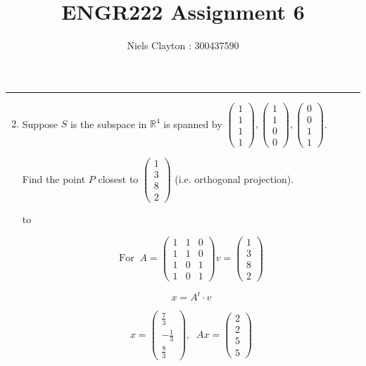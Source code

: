 \documentclass[a4paper,11pt]{article}
\title{\LARGE{\textbf{ENGR222 Assignment 6}}}
\author{Niels Clayton : 300437590}
\date{}
\newcommand{\hdotrule}[1]{\hbox to \textwidth{\leaders\hbox to #1pt{\hss . \hss}\hfil}}
\begin{document}
\begin{preview}
    \maketitle
    \hrule

	\begin{enumerate}
		\setcounter{enumi}{1}
		\item Suppose $S$ is the subspace in $\mathbb{R}^4$ is spanned by $\begin{pmatrix} 1\\1\\1\\1 \end{pmatrix},\begin{pmatrix} 1\\1\\0\\0 \end{pmatrix},\begin{pmatrix} 0\\0\\1\\1 \end{pmatrix}$. 
		
		Find the point $P$ closest to $\begin{pmatrix}1\\3\\8\\2\end{pmatrix}$ (i.e. orthogonal projection).

		\hdotrule{5}

    $$
      \mathrm{For \;\;} A = \begin{pmatrix}1&1&0\\ 1&1&0\\ 1&0&1\\ 1&0&1\end{pmatrix} v = \begin{pmatrix}1\\ 3\\ 8\\ 2\end{pmatrix}
    $$

    $$ x = A^t \cdot v $$


    $$ x = \begin{pmatrix}\frac{7}{3}\\ -\frac{1}{3}\\ \frac{8}{3}\end{pmatrix}, \;\; Ax = \begin{pmatrix}2\\ 2\\ 5\\ 5\end{pmatrix} $$


\end{enumerate}
\end{preview}
\end{document}
